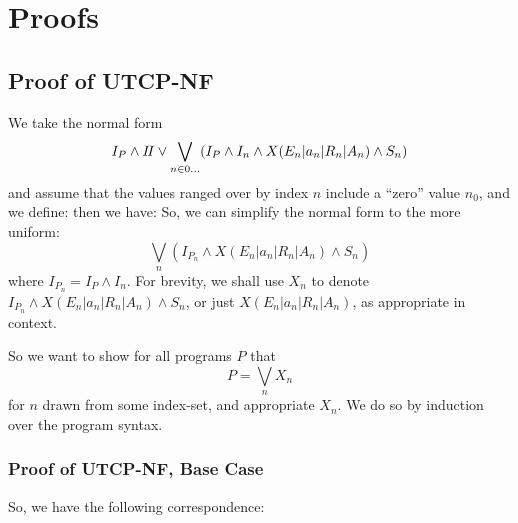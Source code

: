\section{Proofs}\label{sec:proofs}

\subsection{Proof of \textsf{UTCP-NF}}

We take the normal form
\[
  I_P \land I\!I
      \lor
      \bigvee_{n \in 0\dots}
      (I_P \land I_n \land X(E_n|a_n|R_n|A_n) \land S_n)
\]
and  assume that the values ranged over by index $n$
include a ``zero'' value $n_0$,
and we define:
then we have:
So, we can simplify the normal form to the more uniform:
\[
\bigvee_n (I_{P_n} \land X(E_n|a_n|R_n|A_n) \land S_n)
\]
where $I_{P_n} = I_P \land I_n$.
For brevity, we shall use $X_n$ to denote
$I_{P_n} \land X(E_n|a_n|R_n|A_n) \land S_n$,
or just $X(E_n|a_n|R_n|A_n)$, as appropriate in context.

So we want to show for all programs $P$
that
\[
 P = \bigvee_n X_n
\]
for $n$ drawn from some index-set, and appropriate $X_n$.
We do so by induction over the program syntax.

\subsubsection{Proof of \textsf{UTCP-NF}, Base Case}

So, we have the following correspondence:

